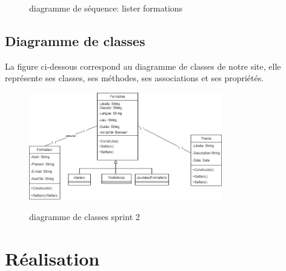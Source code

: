 \begin{itemize}
\begin{figure}[!h]
	\caption{diagramme de séquence: lister formations}
	\label{Diagramme3}
\end{figure}
\newpage
\end{itemize}
\subsection{Diagramme de classes}
La figure ci-dessous correspond au diagramme de classes de notre site, elle représente ses classes, ses méthodes, ses associations et ses propriétés.
\begin{figure}[!h]
	\centering
	{\includegraphics[width=0.75\textwidth]{D) IMAGES/diagClassFor.png}}
	\caption{diagramme de classes sprint 2}
	\label{Diagramme3}
\end{figure}
\section{Réalisation}
